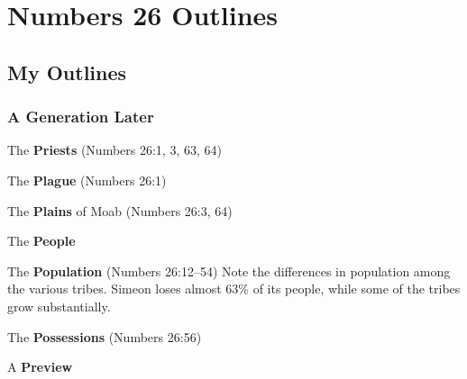 \section{Numbers 26 Outlines}

\subsection{My Outlines}

\subsubsection{A Generation Later}
\begin{compactenum}[I.]
    \item The \textbf{Priests}  (Numbers 26:1, 3, 63, 64)
    \item The \textbf{Plague}  (Numbers 26:1)
    \item The \textbf{Plains} of Moab  (Numbers 26:3, 64)
    \item The \textbf{People} 
    \item The \textbf{Population}  (Numbers 26:12--54) Note the differences in population among the various tribes. Simeon loses almost 63\% of its people, while some of the tribes grow substantially.
    \item The \textbf{Possessions}  (Numbers 26:56)
    \item A \textbf{Preview} 
\end{compactenum}
